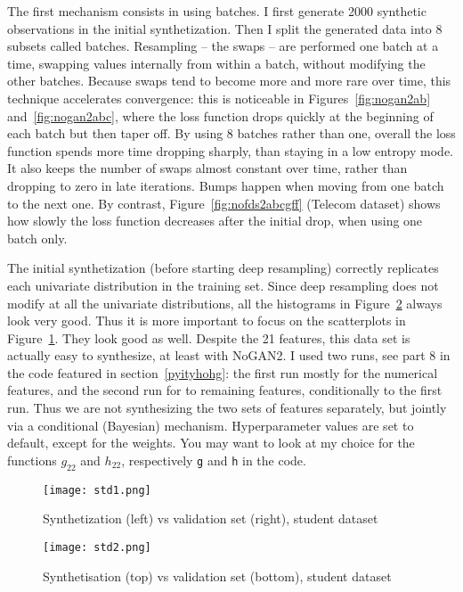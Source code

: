 \documentclass[oneside,10pt]{book}
\begin{document}
The first mechanism consists in using \textcolor{index}{batches}. I first generate 2000 synthetic observations 
in the initial synthetization. Then I split the generated data into 8 subsets called batches. Resampling -- the swaps -- are performed one batch at a time, 
 swapping values internally from within a batch, without modifying the other batches. Because swaps tend to become more and more rare over time, 
 this technique accelerates convergence: this is noticeable in Figures~\ref{fig:nogan2ab} and~\ref{fig:nogan2abc}, where the loss function drops quickly at the beginning of each batch but then taper off. By using 8 batches rather than one, overall the loss function spends more time dropping sharply, than staying in a low entropy mode. It also keeps the number of swaps almost constant over time, rather than dropping to zero in late iterations. Bumps happen when moving from one batch to the next one. By contrast, Figure~\ref{fig:nofds2abcgff} (Telecom dataset) shows how slowly the loss function decreases after the initial drop, when using one batch only.

The initial synthetization (before starting deep resampling) correctly replicates each univariate distribution in the training set. Since deep resampling 
 does not modify at all the univariate distributions, all the histograms in Figure~\ref{fig:rt4nogan2abc} always look very good.
 Thus it is more important to focus on the scatterplots in Figure~\ref{fig:rt3nogan2abc}. They look good as well. Despite the 21 features, this data set is actually easy to synthesize, at least with NoGAN2. I used two runs, see part 8 in the code featured in section~\ref{pyityhohg}: the first run mostly for
 the numerical features, and the second run for to remaining features, conditionally to the first run. Thus we are not synthesizing the two sets of features
 separately, but jointly via a conditional (Bayesian) mechanism.
 Hyperparameter values are set to default, except for the weights. You may want to look at my choice for 
 the functions $g_{22}$ and $h_{22}$, respectively \texttt{g} and \texttt{h} in the code. 

\begin{figure}[H]
\centering
\texttt{[image: std1.png]} %
\caption{Synthetization (left) vs validation set (right), student dataset}
\label{fig:rt3nogan2abc}
\end{figure}

\begin{figure}[H]
\centering
\texttt{[image: std2.png]} %
\caption{Synthetisation (top) vs validation set (bottom), student dataset}
\label{fig:rt4nogan2abc}
\end{figure}
\end{document}

